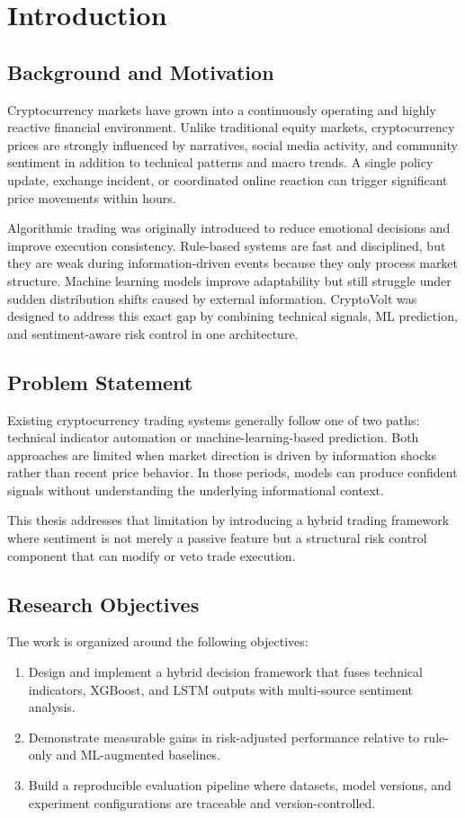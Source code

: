 \chapter{Introduction}\label{chapter1}

\section{Background and Motivation}
Cryptocurrency markets have grown into a continuously operating and highly reactive financial environment. Unlike traditional equity markets, cryptocurrency prices are strongly influenced by narratives, social media activity, and community sentiment in addition to technical patterns and macro trends. A single policy update, exchange incident, or coordinated online reaction can trigger significant price movements within hours.

Algorithmic trading was originally introduced to reduce emotional decisions and improve execution consistency. Rule-based systems are fast and disciplined, but they are weak during information-driven events because they only process market structure. Machine learning models improve adaptability but still struggle under sudden distribution shifts caused by external information. CryptoVolt was designed to address this exact gap by combining technical signals, ML prediction, and sentiment-aware risk control in one architecture.

\section{Problem Statement}
Existing cryptocurrency trading systems generally follow one of two paths: technical indicator automation or machine-learning-based prediction. Both approaches are limited when market direction is driven by information shocks rather than recent price behavior. In those periods, models can produce confident signals without understanding the underlying informational context.

This thesis addresses that limitation by introducing a hybrid trading framework where sentiment is not merely a passive feature but a structural risk control component that can modify or veto trade execution.

\section{Research Objectives}
The work is organized around the following objectives:
\begin{enumerate}
    \item Design and implement a hybrid decision framework that fuses technical indicators, XGBoost, and LSTM outputs with multi-source sentiment analysis.
    \item Demonstrate measurable gains in risk-adjusted performance relative to rule-only and ML-augmented baselines.
    \item Build a reproducible evaluation pipeline where datasets, model versions, and experiment configurations are traceable and version-controlled.
\end{enumerate}

